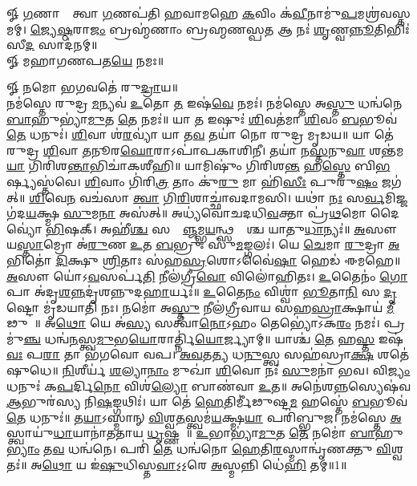 
\newpage
{}

𑍐 \ul{𑌗}𑌣𑌾𑌨𑌾𑌂᳚ 𑌤𑍍𑌵𑌾 \ul{𑌗}𑌣𑌪॑𑌤𑌿 𑌹𑌵𑌾𑌮𑌹𑍇 \ul{𑌕}𑌵𑌿𑌂 𑌕॑\ul{𑌵𑍀}𑌨𑌾𑌮𑍁॑\ul{𑌪}𑌮𑌶𑍍𑌰॑\-𑌵𑌸𑍍𑌤𑌮𑌮𑍍। 
\ul{𑌜𑍍𑌯𑍇}\ul{𑌷𑍍𑌠}𑌰𑌾\ul{𑌜𑌂} 𑌬𑍍𑌰𑌹𑍍𑌮॑𑌣𑌾𑌂 𑌬𑍍𑌰𑌹𑍍𑌮𑌣𑌸𑍍𑌪\ul{𑌤} 𑌆 𑌨𑌃॑ \ul{𑌶𑍃}𑌣𑍍𑌵\ul{𑌨𑍍𑌨𑍂}𑌤𑌿𑌭𑌿𑌃॑ 𑌸𑍀\ul{𑌦} 𑌸𑌾𑌦॑𑌨𑌮𑍍॥ \\
𑍐 𑌮𑌹𑌾𑌗𑌣𑌪𑌤\ul{𑌯𑍇} 𑌨𑌮𑌃॥ 

𑍐 𑌨𑌮𑍋 𑌭𑌗𑌵𑌤𑍇॑ 𑌰𑍁\ul{𑌦𑍍𑌰𑌾}𑌯॥\\
 𑌨𑌮॑𑌸𑍍𑌤𑍇 𑌰𑍁𑌦𑍍𑌰 \ul{𑌮}𑌨𑍍𑌯𑌵॑ \ul{𑌉}𑌤𑍋 \ul{𑌤} 𑌇𑌷॑\ul{𑌵𑍇} 𑌨𑌮𑌃॑। 𑌨𑌮॑𑌸𑍍𑌤𑍇 𑌅\ul{𑌸𑍍𑌤𑍁} 𑌧𑌨𑍍𑌵॑𑌨𑍇 \ul{𑌬𑌾}𑌹𑍁𑌭𑍍𑌯𑌾॑\ul{𑌮𑍁}𑌤 \ul{𑌤𑍇} 𑌨𑌮𑌃॑॥ 𑌯𑌾 \ul{𑌤} 𑌇𑌷𑍁𑌃॑ \ul{𑌶𑌿}𑌵𑌤॑𑌮𑌾 \ul{𑌶𑌿}𑌵𑌂 \ul{𑌬}𑌭𑍂𑌵॑ \ul{𑌤𑍇} 𑌧𑌨𑍁𑌃॑। \ul{𑌶𑌿}𑌵𑌾 𑌶॑\ul{𑌰}𑌵𑍍𑌯𑌾॑ 𑌯𑌾 𑌤\ul{𑌵} 𑌤𑌯𑌾॑ 𑌨𑍋 𑌰𑍁𑌦𑍍𑌰 𑌮𑍃𑌡𑌯॥ 𑌯𑌾 𑌤𑍇॑ 𑌰𑍁𑌦𑍍𑌰 \ul{𑌶𑌿}𑌵𑌾 \ul{𑌤}𑌨𑍂𑌰\ul{𑌘𑍋}𑌰𑌾𑌽𑌪𑌾॑𑌪𑌕𑌾𑌶𑌿𑌨𑍀। 𑌤𑌯𑌾॑ 𑌨\ul{𑌸𑍍𑌤}𑌨𑍁\ul{𑌵𑌾} 𑌶𑌨𑍍𑌤॑𑌮\ul{𑌯𑌾} 𑌗𑌿𑌰𑌿॑𑌶\ul{𑌨𑍍𑌤𑌾}\-𑌭𑌿𑌚𑌾॑𑌕𑌶𑍀𑌹𑌿॥ 𑌯𑌾𑌮𑌿𑌷𑍁𑌂॑ 𑌗𑌿𑌰𑌿𑌶\ul{𑌨𑍍𑌤} 𑌹\ul{𑌸𑍍𑌤𑍇} 𑌬𑌿\ul{𑌭}𑌰𑍍𑌷𑍍𑌯𑌸𑍍𑌤॑𑌵𑍇। \ul{𑌶𑌿}𑌵𑌾𑌂 𑌗𑌿॑𑌰𑌿\ul{𑌤𑍍𑌰} 𑌤𑌾𑌂 𑌕𑍁॑\ul{𑌰𑍁} 𑌮𑌾 𑌹𑌿॑\ul{𑌸𑍀𑌃} 𑌪𑍁𑌰𑍁॑\ul{𑌷𑌂} 𑌜𑌗॑𑌤𑍍॥ \ul{𑌶𑌿}𑌵𑍇\ul{𑌨} 𑌵𑌚॑𑌸𑌾 \ul{𑌤𑍍𑌵𑌾} 𑌗𑌿\ul{𑌰𑌿}𑌶𑌾𑌚𑍍𑌛𑌾॑𑌵𑌦𑌾𑌮𑌸𑌿। 𑌯𑌥𑌾॑ \ul{𑌨𑌃} 𑌸\ul{𑌰𑍍𑌵}𑌮𑌿𑌜𑍍𑌜𑌗॑𑌦\ul{𑌯}𑌕𑍍𑌷𑍍𑌮 \ul{𑌸𑍁}𑌮\ul{𑌨𑌾} 𑌅𑌸॑𑌤𑍍॥ 𑌅𑌧𑍍𑌯॑𑌵𑍋𑌚𑌦𑌧𑌿\ul{𑌵}𑌕𑍍𑌤𑌾 𑌪𑍍𑌰॑\ul{𑌥}𑌮𑍋 𑌦𑍈𑌵𑍍𑌯𑍋॑ \ul{𑌭𑌿}𑌷𑌕𑍍।  𑌅𑌹𑍀॑\ul{𑌶𑍍𑌚} 𑌸𑌰𑍍𑌵𑌾᳚\ul{𑌞𑍍𑌜}𑌮𑍍𑌭\ul{𑌯}𑌨𑍍𑌥𑍍𑌸𑌰𑍍𑌵𑌾᳚𑌶𑍍𑌚 𑌯𑌾𑌤𑍁\ul{𑌧𑌾}𑌨𑍍𑌯𑌃॑॥ \ul{𑌅}𑌸𑍗 𑌯\ul{𑌸𑍍𑌤𑌾}𑌮𑍍𑌰𑍋 𑌅॑\ul{𑌰𑍁}𑌣 \ul{𑌉}𑌤 \ul{𑌬}𑌭𑍍𑌰𑍁𑌃 𑌸𑍁॑\ul{𑌮}𑌙𑍍𑌗𑌲𑌃॑। 𑌯𑍇 \ul{𑌚𑍇}𑌮𑌾 \ul{𑌰𑍁}𑌦𑍍𑌰𑌾 \ul{𑌅}𑌭𑌿𑌤𑍋॑ \ul{𑌦𑌿}𑌕𑍍𑌷𑍁 \ul{𑌶𑍍𑌰𑌿}𑌤𑌾𑌃 𑌸॑𑌹\ul{𑌸𑍍𑌰}𑌶𑍋𑌽𑌵𑍈॑\ul{𑌷𑌾}\ul{} 𑌹𑍇𑌡॑ 𑌈𑌮𑌹𑍇॥ \ul{𑌅}𑌸𑍗 𑌯𑍋॑𑌽\ul{𑌵}𑌸𑌰𑍍𑌪॑\ul{𑌤𑌿} 𑌨𑍀𑌲॑𑌗𑍍𑌰𑍀\ul{𑌵𑍋} 𑌵𑌿𑌲𑍋॑𑌹𑌿𑌤𑌃। \ul{𑌉}𑌤𑍈𑌨𑌂॑ \ul{𑌗𑍋}𑌪𑌾 𑌅॑𑌦𑍃\ul{𑌶}\ul{𑌨𑍍𑌨}𑌦𑍃॑𑌶𑌨𑍍𑌨𑍁𑌦\ul{𑌹𑌾}𑌰𑍍𑌯𑌃॑॥ \ul{𑌉}𑌤𑍈\ul{𑌨𑌂} 𑌵𑌿𑌶𑍍𑌵𑌾॑ \ul{𑌭𑍂}𑌤𑌾\ul{𑌨𑌿} 𑌸 \ul{𑌦𑍃}𑌷𑍍𑌟𑍋 𑌮𑍃॑𑌡𑌯𑌾𑌤𑌿 𑌨𑌃। 𑌨𑌮𑍋॑ 𑌅\ul{𑌸𑍍𑌤𑍁} 𑌨𑍀𑌲॑𑌗𑍍𑌰𑍀𑌵𑌾𑌯 𑌸𑌹\ul{𑌸𑍍𑌰𑌾}𑌕𑍍𑌷𑌾𑌯॑ \ul{𑌮𑍀}𑌢𑍁𑌷𑍇᳚॥ 𑌅\ul{𑌥𑍋} 𑌯𑍇 𑌅॑\ul{𑌸𑍍𑌯} 𑌸𑌤𑍍𑌵𑌾॑\ul{𑌨𑍋}𑌽𑌹𑌂 𑌤𑍇𑌭𑍍𑌯𑍋॑𑌽𑌕\ul{𑌰𑌂} 𑌨𑌮𑌃॑। 𑌪𑍍𑌰 𑌮𑍁॑\ul{𑌞𑍍𑌚} 𑌧𑌨𑍍𑌵॑\ul{𑌨}𑌸𑍍𑌤𑍍𑌵\ul{𑌮𑍁}𑌭\ul{𑌯𑍋}𑌰𑌾𑌰𑍍𑌤𑍍𑌨𑌿॑\ul{𑌯𑍋}𑌰𑍍𑌜𑍍𑌯𑌾𑌮𑍍॥ 𑌯𑌾𑌶𑍍𑌚॑ \ul{𑌤𑍇} 𑌹\ul{𑌸𑍍𑌤} 𑌇𑌷॑\ul{𑌵𑌃} 𑌪\ul{𑌰𑌾} 𑌤𑌾 𑌭॑𑌗𑌵𑍋 𑌵𑌪। \ul{𑌅}\ul{𑌵}𑌤\ul{𑌤𑍍𑌯} 𑌧\ul{𑌨𑍁}𑌸𑍍𑌤𑍍𑌵 𑌸𑌹॑𑌸𑍍𑌰𑌾\ul{𑌕𑍍𑌷} 𑌶𑌤𑍇॑𑌷𑍁𑌧𑍇॥ \ul{𑌨𑌿}𑌶𑍀𑌰𑍍𑌯॑ \ul{𑌶}𑌲𑍍𑌯𑌾\ul{𑌨𑌾𑌂} 𑌮𑍁𑌖𑌾॑ \ul{𑌶𑌿}𑌵𑍋 𑌨𑌃॑ \ul{𑌸𑍁}𑌮𑌨𑌾॑ 𑌭𑌵। 𑌵𑌿\ul{𑌜𑍍𑌯𑌂} 𑌧𑌨𑍁𑌃॑ 𑌕\ul{𑌪}𑌰𑍍𑌦𑌿\ul{𑌨𑍋} 𑌵𑌿𑌶॑\ul{𑌲𑍍𑌯𑍋} 𑌬𑌾𑌣॑𑌵𑌾 \ul{𑌉}𑌤॥
 𑌅𑌨𑍇॑𑌶\ul{𑌨𑍍𑌨}\-𑌸𑍍𑌯𑍇𑌷॑𑌵 \ul{𑌆}𑌭𑍁𑌰॑𑌸𑍍𑌯 𑌨𑌿\ul{𑌷}𑌙𑍍𑌗𑌥𑌿𑌃॑। 𑌯𑌾 𑌤𑍇॑ \ul{𑌹𑍇}𑌤𑌿𑌰𑍍𑌮𑍀॑𑌢𑍁𑌷𑍍𑌟\ul{𑌮} 𑌹𑌸𑍍𑌤𑍇॑ \ul{𑌬}𑌭𑍂𑌵॑ \ul{𑌤𑍇} 𑌧𑌨𑍁𑌃॑॥ 𑌤\ul{𑌯𑌾}𑌽𑌸𑍍𑌮𑌾𑌨𑍍 \ul{𑌵𑌿}𑌶𑍍𑌵\ul{𑌤}𑌸𑍍𑌤𑍍𑌵𑌮॑\ul{𑌯}𑌕𑍍𑌷𑍍𑌮\ul{𑌯𑌾} 𑌪𑌰𑌿॑𑌬𑍍𑌭𑍁𑌜। 𑌨𑌮॑𑌸𑍍𑌤𑍇 \ul{𑌅}𑌸𑍍𑌤𑍍𑌵𑌾𑌯𑍁॑\ul{𑌧𑌾}𑌯𑌾𑌨𑌾॑𑌤𑌤𑌾𑌯 \ul{𑌧𑍃}𑌷𑍍𑌣𑌵𑍇᳚॥ \ul{𑌉}𑌭𑌾𑌭𑍍𑌯𑌾॑\ul{𑌮𑍁}𑌤 \ul{𑌤𑍇} 𑌨𑌮𑍋॑ \ul{𑌬𑌾}𑌹𑍁\ul{𑌭𑍍𑌯𑌾𑌂} 𑌤\ul{𑌵} 𑌧𑌨𑍍𑌵॑𑌨𑍇। 𑌪𑌰𑌿॑ \ul{𑌤𑍇} 𑌧𑌨𑍍𑌵॑𑌨𑍋 \ul{𑌹𑍇}𑌤𑌿\ul{𑌰}𑌸𑍍𑌮𑌾𑌨𑍍𑌵𑍃॑𑌣𑌕𑍍𑌤𑍁 \ul{𑌵𑌿}𑌶𑍍𑌵𑌤𑌃॑॥ 𑌅\ul{𑌥𑍋} 𑌯 𑌇॑\ul{𑌷𑍁}𑌧𑌿𑌸𑍍𑌤\ul{𑌵𑌾}𑌽॒𑌽॒𑌰𑍇 \ul{𑌅}𑌸𑍍𑌮𑌨𑍍𑌨𑌿 𑌧𑍇॑\ul{𑌹𑌿} 𑌤𑌮𑍍॥1॥

